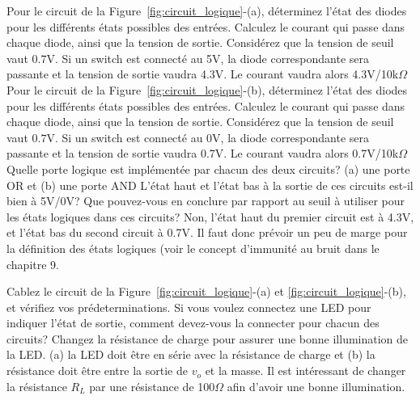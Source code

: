 \documentclass{../template/labo}
\begin{document}
\begin{predet}

\Question
{	Pour le circuit de la Figure~\ref{fig:circuit_logique}-(a), déterminez l'état des diodes pour les différents états possibles des entrées. Calculez le courant qui passe dans chaque diode, ainsi que la tension de sortie. Considérez que la tension de seuil vaut $0.7$V. }
{Si un switch est connecté au 5V, la diode correspondante sera passante et la tension de sortie vaudra 4.3V. Le courant vaudra alors 4.3V/10k$\Omega$}
\label{Q:logique_1}
\Question
{	Pour le circuit de la Figure~\ref{fig:circuit_logique}-(b), déterminez l'état des diodes pour les différents états possibles des entrées. Calculez le courant qui passe dans chaque diode, ainsi que la tension de sortie. Considérez que la tension de seuil vaut $0.7$V. }
{Si un switch est connecté au 0V, la diode correspondante sera passante et la tension de sortie vaudra 0.7V. Le courant vaudra alors 0.7V/10k$\Omega$}
\label{Q:logique_2}
\Question
{	Quelle porte logique est implémentée par chacun des deux circuits? }
{(a) une porte OR et (b) une porte AND}
\label{Q:logique_3}
\Question
{	L'état haut et l'état bas à la sortie de ces circuits est-il bien à 5V/0V? Que pouvez-vous en conclure par rapport au seuil à utiliser pour les états logiques dans ces circuits? }
{Non, l'état haut du premier circuit est à 4.3V, et l'état bas du second circuit à 0.7V. Il faut donc prévoir un peu de marge pour la définition des états logiques (voir le concept d'immunité au bruit dans le chapitre 9.}
\label{Q:logique_4}

\end{predet}

\begin{manip}

\Question
{	Cablez le circuit de la Figure~\ref{fig:circuit_logique}-(a) et \ref{fig:circuit_logique}-(b), et vérifiez vos prédeterminations. }
{}
\label{Q:logique_5}
\Question
{	Si vous voulez connectez une LED pour indiquer l'état de sortie, comment devez-vous la connecter pour chacun des circuits? Changez la résistance de charge pour assurer une bonne illumination de la LED.  }
{(a) la LED doit être en série avec la résistance de charge et (b) la résistance doit être entre la sortie de $v_o$ et la masse. Il est intéressant de changer la résistance $R_L$ par une résistance de 100$\Omega$ afin d'avoir une bonne illumination. }
\label{Q:logique_6}

\end{manip}


\clearpage
\end{document}
